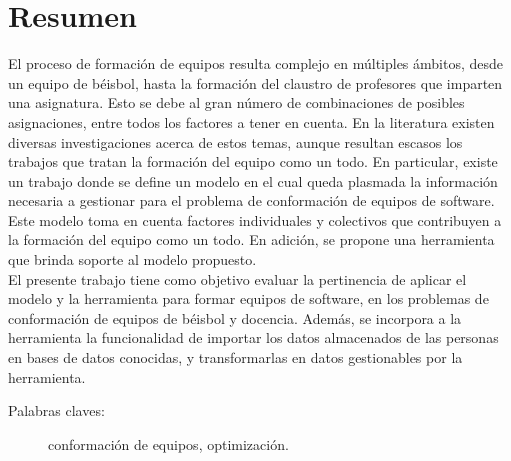 \section*{Resumen}
El proceso de formación de equipos resulta complejo en múltiples ámbitos, desde un equipo de béisbol, hasta la formación del claustro de profesores que imparten una asignatura. Esto se debe al gran número de combinaciones de posibles asignaciones, entre todos los factores a tener en cuenta. En la literatura existen diversas investigaciones acerca de estos temas, aunque resultan escasos los trabajos que tratan la formación del equipo como un todo. En particular, existe un trabajo donde se define un modelo en el cual queda plasmada la información necesaria a gestionar para el problema de conformación de equipos de software. Este modelo toma en cuenta factores individuales y colectivos que contribuyen a la formación del equipo como un todo. En adición, se propone una herramienta que brinda soporte al modelo propuesto. \\

El presente trabajo tiene como objetivo evaluar la pertinencia de aplicar el modelo y la herramienta para formar equipos de software, en los problemas de conformación de equipos de béisbol y docencia. Además, se incorpora a la herramienta la funcionalidad de importar los datos almacenados de las personas en bases de datos conocidas, y transformarlas en datos gestionables por la herramienta.

\begin{description}
	\item[Palabras claves:]{conformación de equipos, optimización.}
\end{description}


